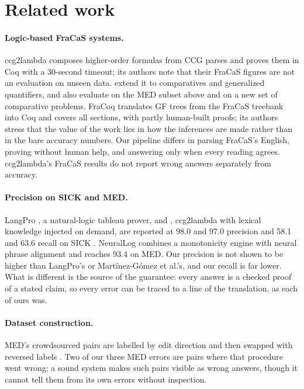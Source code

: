 \documentclass[11pt]{article}
\begin{document}
\section{Related work}
\label{sec:related}

\paragraph{Logic-based FraCaS systems.} ccg2lambda
\citep{mineshima-etal-2015-higher} composes higher-order formulas from
CCG parses and proves them in Coq with a 30-second timeout; its authors
note that their FraCaS figures are not an evaluation on unseen data.
\citet{haruta-etal-2020-logical} extend it to comparatives and
generalized quantifiers, and also evaluate on the MED subset above and
on a new set of comparative problems. FraCoq
\citep{bernardy-chatzikyriakidis-2017-type,bernardy-chatzikyriakidis-2019-wide,bernardy-chatzikyriakidis-2021-applied}
translates GF trees from the FraCaS treebank
\citep{ljunglof-siverbo-2011-bilingual} into Coq and covers all sections,
with partly human-built proofs; its authors stress that the value of
the work lies in how the inferences are made rather than in the bare
accuracy numbers. Our pipeline differs in parsing FraCaS's English,
proving without human help, and answering only when every reading
agrees. ccg2lambda's FraCaS results do not report wrong answers
separately from accuracy.

\paragraph{Precision on SICK and MED.} LangPro
\citep{abzianidze-2015-tableau,abzianidze-2017-langpro}, a natural-logic
tableau prover, and
\citet{martinez-gomez-etal-2017-demand}, ccg2lambda with lexical
knowledge injected on demand, are reported at 98.0 and 97.0 precision and
58.1 and 63.6 recall on SICK \citep[Table 3]{chen-etal-2021-neurallog}. NeuralLog \citep{chen-etal-2021-neurallog}
combines a monotonicity engine with neural phrase alignment and reaches
93.4 on MED. Our precision is not shown to be higher than LangPro's or
Mart\'inez-G\'omez et al.'s, and our recall is far lower. What is
different is the source of the guarantee: every answer is a checked
proof of a stated claim, so every error can be traced to a line of the
translation, as each of ours was.

\paragraph{Dataset construction.} MED's crowdsourced pairs are labelled
by edit direction and then swapped with reversed labels
\citep{yanaka-etal-2019-neural}. Two of our three MED errors are pairs
where that procedure went wrong; a sound system makes such pairs visible
as wrong answers, though it cannot tell them from its own errors without
inspection.
\end{document}
